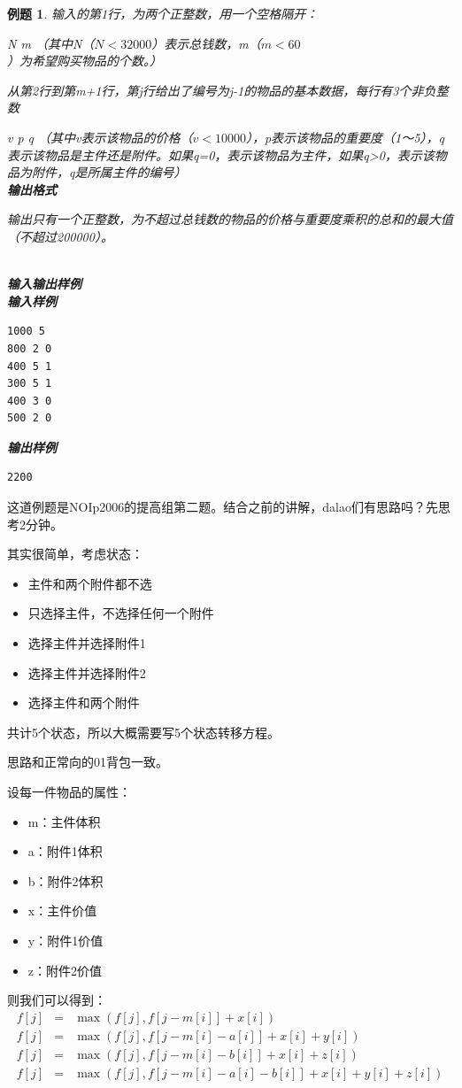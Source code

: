 \documentclass{article}
\newtheorem{example}{例题}[subsection]
\theoremstyle{nonumberplain}
\begin{document}
\begin{example}
	输入的第1行，为两个正整数，用一个空格隔开：

	N m （其中N（$N<32000$）表示总钱数，m（$m<60$）为希望购买物品的个数。）

	从第2行到第m+1行，第j行给出了编号为j-1的物品的基本数据，每行有3个非负整数

	v p q （其中v表示该物品的价格（$v<10000$），p表示该物品的重要度（1～5），q表示该物品是主件还是附件。如果q=0，表示该物品为主件，如果q>0，表示该物品为附件，q是所属主件的编号）\\
	\textbf{输出格式}

	输出只有一个正整数，为不超过总钱数的物品的价格与重要度乘积的总和的最大值（不超过200000）。
	\par
	\ \\
	\textbf{输入输出样例}\\
	\textbf{输入样例}
	\begin{verbatim}
1000 5
800 2 0
400 5 1
300 5 1
400 3 0
500 2 0
\end{verbatim}
	\textbf{输出样例}
	\begin{verbatim}
2200
\end{verbatim}
\end{example}

这道例题是NOIp2006的提高组第二题。结合之前的讲解，dalao们有思路吗？先思考2分钟。

其实很简单，考虑状态：
\begin{itemize}
	\item{主件和两个附件都不选}
	\item{只选择主件，不选择任何一个附件}
	\item{选择主件并选择附件1}
	\item{选择主件并选择附件2}
	\item{选择主件和两个附件}
\end{itemize}

共计5个状态，所以大概需要写5个状态转移方程。

思路和正常向的01背包一致。

设每一件物品的属性：
\begin{itemize}
	\item{m：主件体积}
	\item{a：附件1体积}
	\item{b：附件2体积}
	\item{x：主件价值}
	\item{y：附件1价值}
	\item{z：附件2价值}
\end{itemize}
则我们可以得到：
\begin{eqnarray*}
	f[j]&=&\max(f[j],f[j-m[i]]+x[i])\\
	f[j]&=&\max(f[j],f[j-m[i]-a[i]]+x[i]+y[i])\\
	f[j]&=&\max(f[j],f[j-m[i]-b[i]]+x[i]+z[i])\\
	f[j]&=&\max(f[j],f[j-m[i]-a[i]-b[i]]+x[i]+y[i]+z[i])
\end{eqnarray*}
\end{document}
